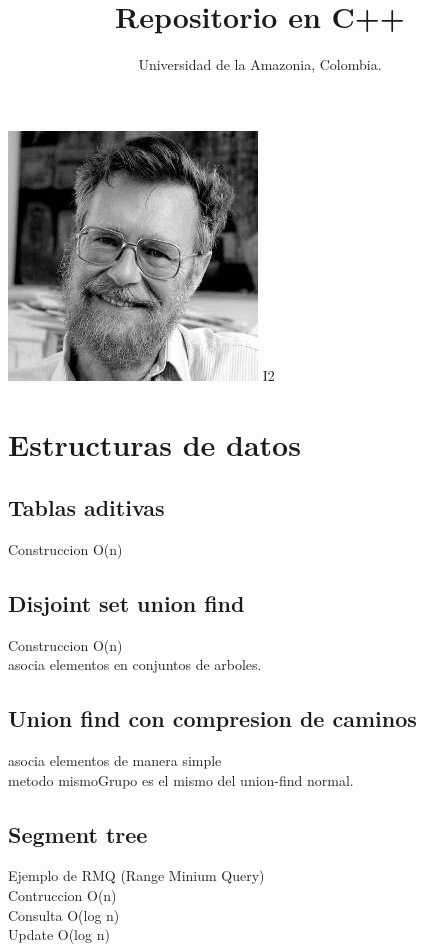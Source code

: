 \documentclass[10pt,landscape,twocolumn,a4paper,notitlepage]{article}
\newcommand\cppfile[2][]{

}
\begin{document}
	
	\title{Repositorio en C++}
	\author{Universidad de la Amazonia, Colombia.}
	\maketitle
	
	\begin{center}
		\includegraphics[scale=0.9]{dijkstra}
		\Huge{I2}
	\end{center}
	\normalsize
	\tableofcontents
	\hfill
	
		\section{Estructuras de datos}
			\subsection{Tablas aditivas}
			Construccion O(n)
			\cppfile[16-33]{estructuras_de_datos/tablas_aditivas.cpp}
			\subsection{Disjoint set union find}
			Construccion O(n)\\asocia elementos en conjuntos de arboles.
			\cppfile[6-53]{estructuras_de_datos/disjoint_set_union_find.cpp}
			\subsection{Union find con compresion de caminos}
			asocia elementos de manera simple\\
			metodo mismoGrupo es el mismo del union-find normal.
			\cppfile[9-27]{estructuras_de_datos/union_find-compresion_de_caminos.cpp}
			\subsection{Segment tree}
			Ejemplo de RMQ (Range Minium Query)\\
			Contruccion O(n)\\Consulta O(log n)\\Update O(log n)
			\cppfile[8-68]{estructuras_de_datos/segment_tree.cpp}%
\end{document}
